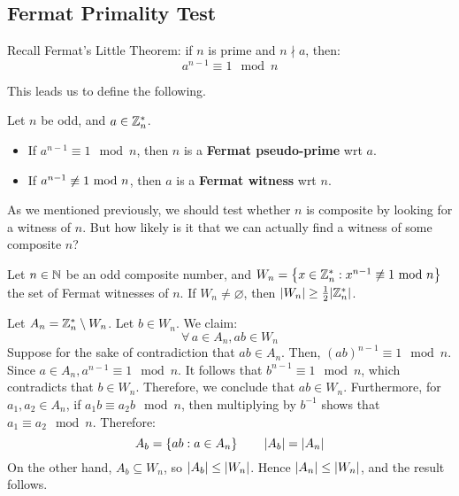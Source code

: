 \documentclass{article}
\begin{document}
\subsection{Fermat Primality Test}

Recall Fermat's Little Theorem: if $ n $ is prime and $ n \nmid a $, then:
\begin{equation*}
    a^{n-1} \equiv 1 \mod n
\end{equation*}

This leads us to define the following.

\begin{defn}
    Let $ n $ be odd, and $ a \in \mathbb{Z}_{n}^{*} $.
    \begin{itemize}
        \item If $ a^{n-1} \equiv 1 \mod n $, then $ n $ is
            a \textbf{Fermat pseudo-prime} wrt $ a $.
        \item If $ a^{n-1} \cnot\equiv 1 \mod n $, then $ a $ is
            a \textbf{Fermat witness} wrt $ n $.
    \end{itemize}
\end{defn}

As we mentioned previously, we should test whether $ n $ is composite by looking for a
witness of $ n $.
But how likely is it that we can actually find a witness of some composite $ n $?

\begin{thm}
    Let $ n \in \mathbb{N} $ be an odd composite number, and
    $ W_{n} = \set{x \in \bb{Z}_{n}^{*} : x^{n-1} \cnot\equiv 1 \mod n} $ the set of Fermat
    witnesses of $ n $. \vsp
    If $ W_{n} \neq \varnothing $, then $ \abs{W_{n}} \geq \frac{1}{2}\abs{\mathbb{Z}_{n}^{*}} $.
\end{thm}

\begin{pf}[source=Primary Source Material]
    Let $ A_{n} = \mathbb{Z}_{n}^{*} \setminus W_{n} $.
    Let $ b \in W_{n} $. We claim:
    \begin{equation*}
        \forall \, a \in A_{n}, ab \in W_{n}
    \end{equation*}
    Suppose for the sake of contradiction that $ ab \in A_{n} $.
    Then, $ (ab)^{n-1} \equiv 1 \mod n $. Since $ a \in A_{n}, a^{n-1} \equiv 1 \mod n $.
    It follows that $ b^{n-1} \equiv 1 \mod n $, which contradicts that $ b \in W_{n} $.
    Therefore, we conclude that $ ab \in W_{n} $. \vsp
    Furthermore, for $ a_{1}, a_{2} \in A_{n} $, if $ a_{1}b \equiv a_{2}b \mod n $, then
    multiplying by $ b^{-1} $ shows that $ a_{1} \equiv a_{2} \mod n $. Therefore:
    \begin{equation*}
        A_{b} = \left\{{ab : a \in A_{n}}\right\} \qquad \abs{A_{b}} = \abs{A_{n}}
    \end{equation*}
    On the other hand, $ A_{b} \subseteq W_{n} $, so $ \abs{A_{b}} \leq \abs{W_{n}} $.
    Hence $ \abs{A_{n}} \leq \abs{W_{n}} $, and the result follows.
\end{pf}
\end{document}

